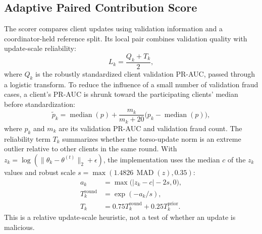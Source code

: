 \documentclass{ieeeaccess}
\begin{document}
\subsection{Adaptive Paired Contribution Score}
The scorer compares client updates using validation information and a
coordinator-held reference split. Its local pair combines validation quality
with update-scale reliability:
\begin{equation}
  L_k=\frac{Q_k+T_k}{2},
\end{equation}
where $Q_k$ is the robustly standardized client validation PR-AUC, passed
through a logistic transform. To reduce the influence of a small number of
validation fraud cases, a client's PR-AUC is shrunk toward the participating
clients' median before standardization:
\begin{equation}
  \widetilde{p}_k=\operatorname{median}(p)
  +\frac{m_k}{m_k+20}\bigl(p_k-\operatorname{median}(p)\bigr),
\end{equation}
where $p_k$ and $m_k$ are its validation PR-AUC and validation fraud count.
The reliability term $T_k$ summarizes whether the torso-update norm is an
extreme outlier relative to other clients in the same round. With
$z_k=\log(\lVert\theta_k-\theta^{(t)}\rVert_2+\epsilon)$, the implementation
uses the median $c$ of the $z_k$ values and robust scale
$s=\max(1.4826\,\operatorname{MAD}(z),0.35)$:
\begin{align}
  a_k &= \max\bigl(|z_k-c|-2s,0\bigr),\\
  T_k^{\mathrm{round}} &= \exp(-a_k/s),\\
  T_k &= 0.75T_k^{\mathrm{round}}+0.25T_k^{\mathrm{prior}}.
\end{align}
This is a relative update-scale heuristic, not a test of whether an update is
malicious.
\end{document}
